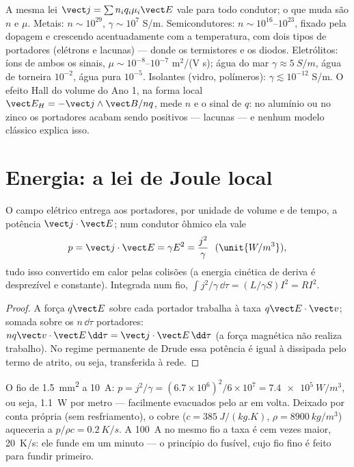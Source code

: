 \begin{remark}\label{rem:b2:charges-currents-conduction:materials}
A mesma lei $\vect j = \sum n_iq_i\mu_i\vect E$ vale para todo condutor;
o que muda são $n$ e $\mu$. Metais: $n \sim 10^{29}$, $\gamma \sim 10^7$
S/m. Semicondutores: $n \sim 10^{16}$--$10^{23}$, fixado pela dopagem e crescendo
acentuadamente com a temperatura, com dois tipos de portadores (elétrons e
lacunas) --- donde os termistores e os diodos. Eletrólitos: íons de ambos os
sinais, $\mu \sim 10^{-8}$--$10^{-7}$ m$^2$/(V s); água do mar $\gamma \approx \qty{5}{S/m}$,
água de torneira $10^{-2}$, água pura $10^{-5}$. Isolantes (vidro, polímeros):
$\gamma \lesssim 10^{-12}$ S/m. O efeito Hall do volume do Ano 1, na
forma local $\vect E_H = -\vect j\wedge\vect B/nq$, mede $n$ e o sinal
de $q$: no alumínio ou no zinco os portadores acabam sendo positivos ---
lacunas --- e nenhum modelo clássico explica isso.
\end{remark}

\section{Energia: a lei de Joule local}

\begin{proposition}\label{prop:b2:charges-currents-conduction:joule}
O campo elétrico entrega aos portadores, por unidade de volume e de tempo,
a potência $\vect j\cdot\vect E$; num condutor ôhmico ela vale
\[
p = \vect j\cdot\vect E = \gamma E^2 = \frac{j^2}\gamma \ \ (\unit{W/m^3}) ,
\]
tudo isso convertido em calor pelas colisões (a energia cinética de
deriva é desprezível e constante). Integrada num fio, $\int j^2/\gamma\,\dd\tau
= (L/\gamma S)I^2 = RI^2$.
\end{proposition}

\begin{proof}
A força $q\vect E$ sobre cada portador trabalha à taxa $q\vect E\cdot\vect v$;
somada sobre os $n\,\dd\tau$ portadores: $nq\vect v\cdot\vect E\,\dd\tau = \vect j\cdot
\vect E\,\dd\tau$ (a força magnética não realiza trabalho). No regime
permanente de Drude essa potência é igual à dissipada pelo termo de atrito, ou seja,
transferida à rede.
\end{proof}

\begin{example}\label{ex:b2:charges-currents-conduction:heating}
O fio de \qty{1.5}{mm^2} a \qty{10}{A}: $p = j^2/\gamma = (6.7 \times 10^6)^2/6 \times 10^7 =
\qty{7.4e5}{W/m^3}$, ou seja, \qty{1.1}{W} por metro --- facilmente evacuados pelo ar
em volta. Deixado por conta própria (sem resfriamento), o cobre ($c = \qty{385}{J/(kg.K)}$,
$\rho = \qty{8900}{kg/m^3}$) aqueceria a $p/\rho c = \qty{0.2}{K/s}$. A \qty{100}{A}
no mesmo fio a taxa é cem vezes maior, \qty{20}{K/s}: ele
funde em um minuto --- o princípio do fusível, cujo fio fino é
feito para fundir primeiro.
\end{example}

